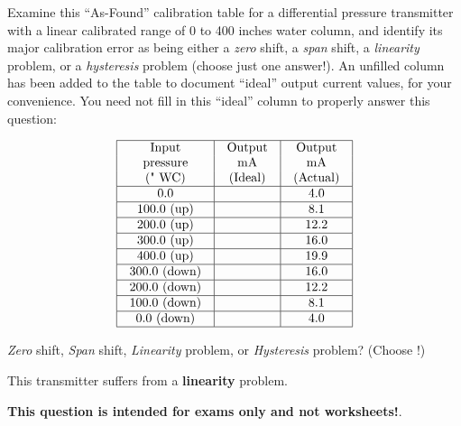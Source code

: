 

Examine this ``As-Found'' calibration table for a differential pressure transmitter with a linear calibrated range of 0 to 400 inches water column, and identify its major calibration error as being either a {\it zero} shift, a {\it span} shift, a {\it linearity} problem, or a {\it hysteresis} problem (choose just one answer!).  An unfilled column has been added to the table to document ``ideal'' output current values, for your convenience.  You need not fill in this ``ideal'' column to properly answer this question:


$$\vbox{\offinterlineskip
\halign{\strut
\vrule \quad\hfil # \ \hfil & 
\vrule \quad\hfil # \ \hfil & 
\vrule \quad\hfil # \ \hfil \vrule \cr
\noalign{\hrule}
%
Input & Output & Output \cr
%
pressure & mA & mA \cr
%
(" WC) & (Ideal) & (Actual) \cr
%
\noalign{\hrule}
%
0.0 & & 4.0 \cr
%
\noalign{\hrule}
%
100.0 (up) & & 8.1 \cr
%
\noalign{\hrule}
%
200.0 (up) & & 12.2 \cr
%
\noalign{\hrule}
%
300.0 (up) & & 16.0 \cr
%
\noalign{\hrule}
%
400.0 (up) & & 19.9 \cr
%
\noalign{\hrule}
%
300.0 (down) & & 16.0 \cr
%
\noalign{\hrule}
%
200.0 (down) & & 12.2 \cr
%
\noalign{\hrule}
%
100.0 (down) & & 8.1 \cr
%
\noalign{\hrule}
%
0.0 (down) & & 4.0 \cr
%
\noalign{\hrule}
} %
}$$ %

{\it Zero} shift, {\it Span} shift, {\it Linearity} problem, or {\it Hysteresis} problem?  (Choose !)







This transmitter suffers from a {\bf linearity} problem.







{\bf This question is intended for exams only and not worksheets!}.



